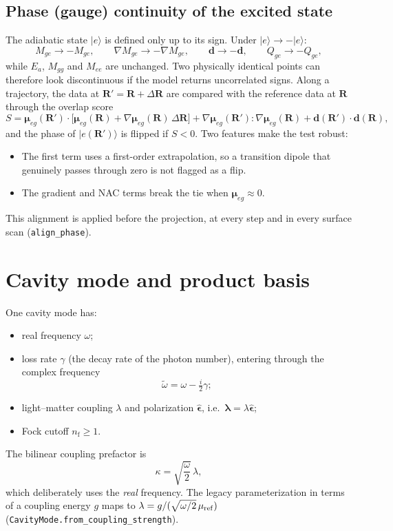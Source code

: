 \documentclass[11pt]{article}
\newcommand{\ket}[1]{\lvert #1 \rangle}
\newcommand{\R}{\mathbf{R}}
\newcommand{\grad}{\nabla}
\newcommand{\dd}{\mathbf{d}}
\newcommand{\eps}{\hat{\bm{\epsilon}}}
\newcommand{\mub}{\bm{\mu}}
\newcommand{\wt}{\tilde\omega}
\newcommand{\code}[1]{\texttt{#1}}
\newcommand{\nf}{n_{\mathrm f}}
\begin{document}
\subsection{Phase (gauge) continuity of the excited state}
\label{sec:phase}
The adiabatic state $\ket{e}$ is defined only up to its sign. Under $\ket{e}\to-\ket{e}$:
\begin{equation}
M_{ge}\to -M_{ge},\qquad \grad M_{ge}\to-\grad M_{ge},\qquad \dd\to-\dd,\qquad Q_{ge}\to -Q_{ge},
\end{equation}
while $E_a$, $M_{gg}$ and $M_{ee}$ are unchanged. Two physically identical points can therefore look discontinuous if the model returns uncorrelated signs. Along a trajectory, the data at $\R'=\R+\Delta\R$ are compared with the reference data at $\R$ through the overlap score
\begin{equation}
S=\mub_{eg}(\R')\cdot\big[\mub_{eg}(\R)+\grad\mub_{eg}(\R)\,\Delta\R\big]
+\grad\mub_{eg}(\R'):\grad\mub_{eg}(\R)
+\dd(\R')\cdot\dd(\R),
\label{eq:phase}
\end{equation}
and the phase of $\ket{e(\R')}$ is flipped if $S<0$. Two features make the test robust:
\begin{itemize}
\item The first term uses a first-order extrapolation, so a transition dipole that genuinely passes through zero is not flagged as a flip.
\item The gradient and NAC terms break the tie when $\mub_{eg}\approx0$.
\end{itemize}
This alignment is applied before the projection, at every step and in every surface scan (\code{align\_phase}).

\section{Cavity mode and product basis}
One cavity mode has:
\begin{itemize}
\item real frequency $\omega$;
\item loss rate $\gamma$ (the decay rate of the photon number), entering through the complex frequency
\begin{equation}
\wt=\omega-\tfrac{i}{2}\gamma;
\end{equation}
\item light--matter coupling $\lambda$ and polarization $\eps$, i.e.\ $\bm\lambda=\lambda\eps$;
\item Fock cutoff $\nf\ge1$.
\end{itemize}
The bilinear coupling prefactor is
\begin{equation}
\kappa=\sqrt{\frac{\omega}{2}}\,\lambda ,
\end{equation}
which deliberately uses the \emph{real} frequency. The legacy parameterization in terms of a coupling energy $g$ maps to $\lambda=g/(\sqrt{\omega/2}\,\mu_{\rm ref})$ (\code{CavityMode.from\_coupling\_strength}).
\end{document}
